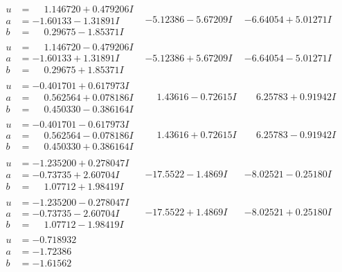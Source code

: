 \documentclass[1p]{elsarticle_modified}
\theoremstyle{definition}
\begin{document}
$$\begin{array}{c|c|c}
\begin{aligned}
u &= \phantom{-}1.146720 + 0.479206 I \\
a &= -1.60133 - 1.31891 I \\
b &= \phantom{-}0.29675 - 1.85371 I\end{aligned}
 & -5.12386 - 5.67209 I & -6.64054 + 5.01271 I \\ \hline\begin{aligned}
u &= \phantom{-}1.146720 - 0.479206 I \\
a &= -1.60133 + 1.31891 I \\
b &= \phantom{-}0.29675 + 1.85371 I\end{aligned}
 & -5.12386 + 5.67209 I & -6.64054 - 5.01271 I \\ \hline\begin{aligned}
u &= -0.401701 + 0.617973 I \\
a &= \phantom{-}0.562564 + 0.078186 I \\
b &= \phantom{-}0.450330 - 0.386164 I\end{aligned}
 & \phantom{-}1.43616 - 0.72615 I & \phantom{-}6.25783 + 0.91942 I \\ \hline\begin{aligned}
u &= -0.401701 - 0.617973 I \\
a &= \phantom{-}0.562564 - 0.078186 I \\
b &= \phantom{-}0.450330 + 0.386164 I\end{aligned}
 & \phantom{-}1.43616 + 0.72615 I & \phantom{-}6.25783 - 0.91942 I \\ \hline\begin{aligned}
u &= -1.235200 + 0.278047 I \\
a &= -0.73735 + 2.60704 I \\
b &= \phantom{-}1.07712 + 1.98419 I\end{aligned}
 & -17.5522 - 1.4869 I & -8.02521 - 0.25180 I \\ \hline\begin{aligned}
u &= -1.235200 - 0.278047 I \\
a &= -0.73735 - 2.60704 I \\
b &= \phantom{-}1.07712 - 1.98419 I\end{aligned}
 & -17.5522 + 1.4869 I & -8.02521 + 0.25180 I \\ \hline\begin{aligned}
u &= -0.718932\phantom{ +0.000000I} \\
a &= -1.72386\phantom{ +0.000000I} \\
b &= -1.61562\phantom{ +0.000000I}\end{aligned}

\end{array}$$
\end{document}
